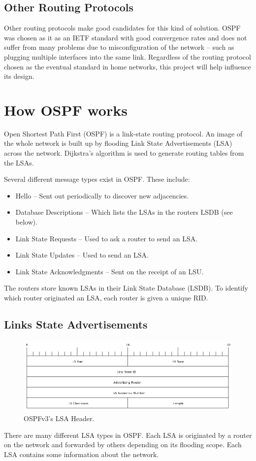 \subsection{Other Routing Protocols}
Other routing protocols make good candidates for this kind of solution. OSPF
was chosen as it as an IETF standard with good convergence rates and does not
suffer from many problems due to misconfiguration of the network -- such as
plugging multiple interfaces into the same link. Regardless of the routing
protocol chosen as the eventual standard in home networks, this project will
help influence its design.

\section{How OSPF works}
Open Shortest Path First (OSPF) is a link-state routing protocol. An image of
the whole network is built up by flooding Link State Advertisements (LSA)
across the network. Dijkstra's algorithm is used to generate routing tables from
the LSAs.

Several different message types exist in OSPF\@. These include:
\begin{itemize}
 \item Hello -- Sent out periodically to discover new adjacencies.
 \item Database Descriptions -- Which lists the LSAs in the routers LSDB (see below).
 \item Link State Requests -- Used to ask a router to send an LSA.
 \item Link State Updates -- Used to send an LSA.
 \item Link State Acknowledgments -- Sent on the receipt of an LSU.
\end{itemize}

The routers store known LSAs in their Link State Database
(LSDB). To identify which router
originated an LSA, each router is given a unique RID.

\subsection{Links State Advertisements}
\begin{figure}
\begin{center}
	\includegraphics[width=\linewidth]{../Diagrams/Packets/LSA-header.png}
	\caption{OSPFv3's LSA Header.}\label{fig:LSA-header}
\end{center}
\end{figure}
There are many different LSA types in OSPF\@. Each LSA is originated by
a router on the network and forwarded by others depending on its
flooding scope. Each LSA contains some information about the network. 
 
